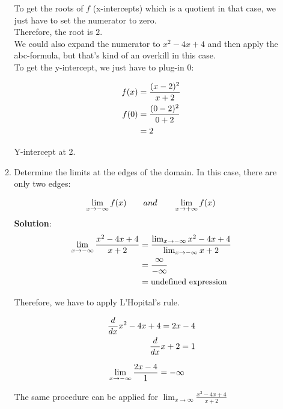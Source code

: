 \documentclass[a4paper]{article}
\begin{document}
\begin{enumerate}
\begin{enumerate}
To get the roots of $f$ (x-intercepts) which is a quotient in that case, we just have to set the numerator to zero.\\

Therefore, the root is $2$.\\
We could also expand the numerator to $x^2 - 4x + 4$ and then apply the abc-formula, but that's kind of an overkill in this case.\\

To get the y-intercept, we just have to plug-in 0:

\begin{align}
	f(x) &= \frac{(x-2)^2}{x+2}\notag\\
	f(0) &= \frac{(0-2)^2}{0+2}\notag\\
	&= 2\notag
\end{align}	
	
Y-intercept at 2.\\
	
	
	
	
	\item Determine the limits at the edges of the domain. In this case, there are only two edges:
	
	\begin{align}
	\lim_{x \to -\infty }f(x) \qquad and \qquad \lim_{x \to +\infty}f(x)\notag	
	\end{align}	
	\textbf{Solution}:\\
	

	
\begin{align}
	\lim_{x \to -\infty} \frac{x^2 - 4x + 4}{x+2} &= \frac{\lim_{x \to -\infty}x^2 - 4x + 4 }{\lim_{x \to -\infty} x + 2} \notag\\
	&= \frac{\infty}{-\infty}\notag\\
	&= \text{undefined expression}\notag
\end{align}	
	
Therefore, we have to apply L'Hopital's rule. 	
	
\begin{align*}
\frac{d}{dx} x^2 - 4x + 4 = 2x - 4\notag\\
\frac{d}{dx} x + 2 = 1\notag\\
\end{align*}

\begin{align}
	\lim_{x \to -\infty} \frac{2x - 4}{1} &= -\infty\notag 
\end{align}	

The same procedure can be applied for $\lim_{x \to \infty} \frac{x^2 - 4x + 4}{x+2}$
	

\end{enumerate}
\end{enumerate}
\end{document}
